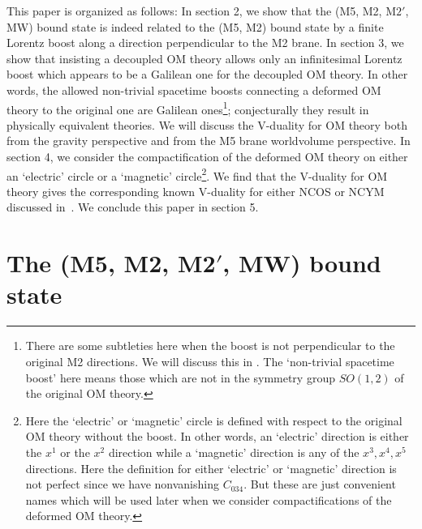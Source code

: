 \documentclass[a4paper,12pt]{article}
\newcommand{\sect}[1]{\setcounter{equation}{0}\section{#1}}
\begin{document}
	This paper is organized as follows: In section 2, we show 
that the (M5, M2, M$2'$, MW) bound state is indeed related to the (M5, M2)
bound state by a finite Lorentz boost along a direction perpendicular 
to the M2 brane. In section 3, we show that insisting a decoupled OM 
theory allows only an infinitesimal Lorentz boost which appears to be 
a Galilean one for the decoupled OM theory. In other words, the allowed
non-trivial spacetime boosts connecting a deformed OM theory to the 
original one are Galilean ones\footnote{There are some subtleties
here when the boost is not perpendicular to the original M2
directions. We will discuss this in \cite{clwone}. The `non-trivial
spacetime boost' here means those which are not in the symmetry group
$SO(1, 2)$ of the original OM theory.}; conjecturally they result in 
physically equivalent theories.  
We will discuss the V-duality for OM theory both from the gravity 
perspective and from the M5 brane worldvolume
perspective.
In section 4, we consider the compactification of the deformed OM
theory on either an `electric' circle or a `magnetic' circle\footnote{
Here the `electric' or `magnetic' circle is defined with respect to the 
original OM theory without the boost. In other words, an `electric'
direction is either the $x^1$ or the $x^2$ direction while a `magnetic'
direction is any of the $x^3, x^4, x^5$ directions. Here the definition
for either `electric' or `magnetic' direction is not perfect since 
we have nonvanishing $C_{034}$. But these are just  convenient names which
will be used later when we consider compactifications of the deformed
OM theory.}. We find that
the V-duality for OM theory gives the corresponding known V-duality for
either NCOS or NCYM discussed in~\cite{CW,CLW}. We conclude this paper in
section 5.



\sect{The (M5, M2, M2$'$, MW) bound state}
\end{document}
